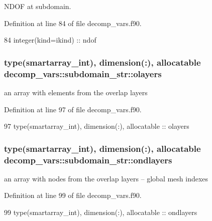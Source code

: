 N\+D\+OF at subdomain. 



Definition at line 84 of file decomp\+\_\+vars.\+f90.


\begin{DoxyCode}
84     \textcolor{keywordtype}{integer(kind=ikind)} :: ndof
\end{DoxyCode}
\subsubsection[{olayers}]{\setlength{\rightskip}{0pt plus 5cm}type({\bf smartarray\+\_\+int}), dimension(\+:), allocatable decomp\+\_\+vars\+::subdomain\+\_\+str\+::olayers}\label{structdecomp__vars_1_1subdomain__str_a21b30bedbb177b2eb481af2b3a3ab709}


an array with elements from the overlap layers 



Definition at line 97 of file decomp\+\_\+vars.\+f90.


\begin{DoxyCode}
97     \textcolor{keywordtype}{type}(smartarray_int), \textcolor{keywordtype}{dimension(:)}, \textcolor{keywordtype}{allocatable} :: olayers
\end{DoxyCode}
\subsubsection[{ondlayers}]{\setlength{\rightskip}{0pt plus 5cm}type({\bf smartarray\+\_\+int}), dimension(\+:), allocatable decomp\+\_\+vars\+::subdomain\+\_\+str\+::ondlayers}\label{structdecomp__vars_1_1subdomain__str_ab9e7ef161a21183bd7f581a8f0c4a595}


an array with nodes from the overlap layers -- global mesh indexes 



Definition at line 99 of file decomp\+\_\+vars.\+f90.


\begin{DoxyCode}
99     \textcolor{keywordtype}{type}(smartarray_int), \textcolor{keywordtype}{dimension(:)}, \textcolor{keywordtype}{allocatable} :: ondlayers
\end{DoxyCode}
